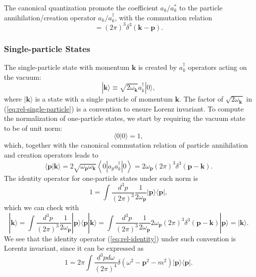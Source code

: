 The canonical quantization promote the coefficient $a_{k}/a_{k}^*$ to the particle annihilation/creation operator $a_{k}/a_{k}^\dagger$, with the commutation relation
\begin{equation}
	[a_{k}, a_{p}^\dagger] = (2\pi)^{3} \delta^{3}(\bm{k}-\bm{p}).
\end{equation}

\subsubsection{Single-particle States}
The single-particle state with momentum $\bm k$ is created by $a_{k}^{\dagger}$ operators acting on the vacuum:
\begin{equation}
	|\bm{k}\rangle \equiv \sqrt{2\omega_{\bm k}} a_{k}^{\dagger}|0\rangle,
	\label{eq:rel-single-particle}
\end{equation}
where $|\bm{k}\rangle$ is a state with a single particle of momentum $\bm{k}$.
The factor of $\sqrt{2 \omega_{\bm k}}$ in (\ref{eq:rel-single-particle}) is a convention to ensure Lorenz invariant.
To compute the normalization of one-particle states, we start by requiring the vacuum state to be of unit norm:
\begin{equation}
	\langle 0|0\rangle=1,
\end{equation}
which, together with the canonical commutation relation of particle annihilation and creation operators leads to
\begin{equation}
	\langle\bm{p}|\bm{k}\rangle 
	= 2\sqrt{\omega_{\bm p} \omega_{\bm k}}\left\langle 0\left|a_{p} a_{k}^{\dagger}\right| 0\right\rangle
	= 2 \omega_{\bm p}(2\pi)^{3} \delta^{3}(\bm{p}-\bm{k}).
\end{equation}
The identity operator for one-particle states under such norm is
\begin{equation}
	1=\int \frac{d^{3} p}{(2\pi)^{3}} \frac{1}{2\omega_{\bm p}}|\bm{p}\rangle\langle\bm{p}|, \label{eq:rel-identity}
\end{equation}
which we can check with
\begin{equation*}
	|\bm{k}\rangle
	=\int \frac{d^{3} p}{(2\pi)^{3}} \frac{1}{2\omega_{\bm p}}|\bm{p}\rangle\langle\bm{p}|\bm{k}\rangle
	=\int \frac{d^{3} p}{(2\pi)^{3}} \frac{1}{2\omega_{\bm p}} 2\omega_{\bm p}(2\pi)^3 \delta^3(\bm{p}-\bm{k})|\bm{p}\rangle
	=|\bm{k}\rangle.
\end{equation*}
We see that the identity operator (\ref{eq:rel-identity}) under such convention is Lorentz invariant, since it can be expressed as
\begin{equation}
	1 = 2\pi \int \frac{d^{3} p d\omega}{(2\pi)^{4}} \delta(\omega^2-{\bm{p}}^2-m^2) |\bm p\rangle\langle \bm p|.
\end{equation}

